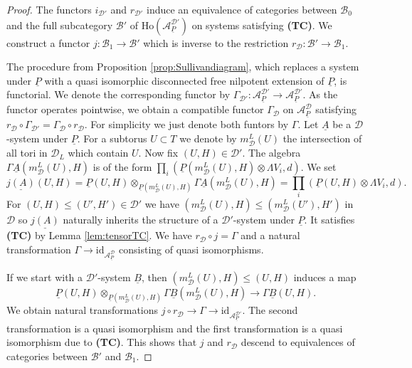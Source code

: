 \documentclass[12pt,a4paper]{article}
\newcommand{\id}{\mathrm{id}}
\theoremstyle{definition}
\begin{document}
\begin{proof}
The functors $i_{\mathcal{D}'}$ and $r_{\mathcal{D}'}$ induce an equivalence of categories between $\mathcal{B}_0$ and the full subcategory $\mathcal{B}'$ of $\mathrm{Ho}(\mathcal{A}^{\mathcal{D}'}_{\underline{P}})$ on systems satisfying \textbf{(TC)}. We construct a functor $j\colon\mathcal{B}_1\rightarrow \mathcal{B}'$ which is inverse to the restriction $r_{\mathcal{D}}\colon \mathcal{B}'\rightarrow\mathcal{B}_1$. 


The procedure from Proposition \ref{prop:Sullivandiagram}, which replaces a system under $\underline{P}$ with a quasi isomorphic disconnected free nilpotent extension of $\underline{P}$, is functorial. We denote the corresponding functor by $\Gamma_{\mathcal{D}'}\colon \mathcal{A}^{\mathcal{D}'}_{\underline{P}}\rightarrow \mathcal{A}^{\mathcal{D}'}_{\underline{P}}$. As the functor operates pointwise, we obtain a compatible functor $\Gamma_\mathcal{D}$ on $\mathcal{A}^{\mathcal{D}}_{\underline{P}}$ satisfying $r_{\mathcal{D}}\circ \Gamma_{\mathcal{D}'}=\Gamma_{\mathcal{D}}\circ r_\mathcal{D}$. For simplicity we just denote both funtors by $\Gamma$. Let $\underline{A}$ be a $\mathcal{D}$-system under $\underline{P}$.
For a subtorus $U\subset T$ we denote by $m^L_\mathcal{D}(U)$ the intersection of all tori in $\mathcal{D}_L$ which contain $U$. Now fix $(U,H)\in\mathcal{D}'$.
The algebra $\Gamma\underline{A}(m_\mathcal{D}^L(U),H)$ is of the form $\prod_i (\underline{P}(m_\mathcal{D}^L(U),H)\otimes \Lambda V_i,d)$.
We set \[\underline{j(A)}(U,H)= \underline{P}(U,H)\otimes_{\underline{P}(m^L_\mathcal{D}(U),H)} \Gamma \underline{A}(m^L_\mathcal{D}(U),H)= \prod_i (\underline{P}(U,H)\otimes \Lambda V_i,d).\]
For $(U,H)\leq (U',H')\in \mathcal{D}'$ we have $(m^L_\mathcal{D}(U),H)\leq (m^L_\mathcal{D}(U'),H')$ in $\mathcal{D}$ so $\underline{j(A)}$ naturally inherits the structure of a $\mathcal{D}'$-system under $\underline{P}$. It satisfies \textbf{(TC)} by Lemma \ref{lem:tensorTC}. We have $r_{\mathcal{D}}\circ j=\Gamma$ and a natural transformation $\Gamma\rightarrow \id_{\mathcal{A}^\mathcal{D}_{\underline{P}}}$ consisting of quasi isomorphisms.

If we start with a $\mathcal{D}'$-system $\underline{B}$, then
$(m^L_\mathcal{D}(U),H)\leq (U,H)$ induces a map \[\underline{P}(U,H)\otimes_{\underline{P}(m^L_\mathcal{D}(U),H)}\Gamma\underline{B}(m^L_\mathcal{D}(U),H)\rightarrow \Gamma\underline{B}(U,H).\]
We obtain natural transformations $j\circ r_{\mathcal{D}}\rightarrow \Gamma\rightarrow \id_{\mathcal{A}^{\mathcal{D}'}_{\underline{P}}}$. The second transformation is a quasi isomorphism and the first transformation is a quasi isomorphism due to \textbf{(TC)}. This shows that $j$ and $r_\mathcal{D}$ descend to equivalences of categories between $\mathcal{B}'$ and $\mathcal{B}_1$.
\end{proof}
\end{document}
